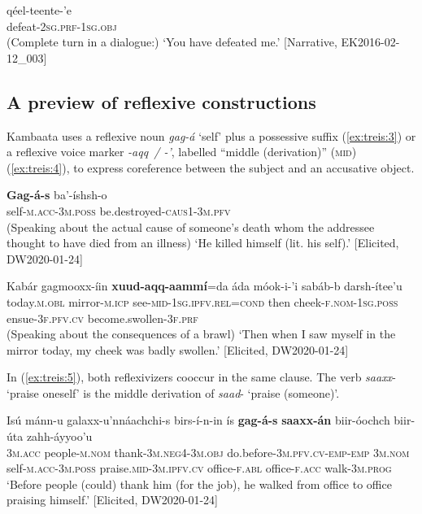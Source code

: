 \documentclass[output=paper]{langscibook}
\begin{document}
\ea\label{ex:treis:2} 
\gll qéel-teente-’e\\
     defeat-2\textsc{sg.prf-1sg.obj}\\
\glt (Complete turn in a dialogue:) ‘You have defeated me.’ [Narrative, EK2016-02-12\_003]
\z

\subsection{A preview of reflexive constructions}\label{sec:treis:1.2}

Kambaata uses a reflexive noun \textit{gag-á} ‘self’ plus a possessive suffix (\ref{ex:treis:3}) or a reflexive voice marker \textit{-aqq~/ -’}, labelled “middle (derivation)” (\textsc{mid}) (\ref{ex:treis:4}), to express coreference between the subject and an accusative object.

\ea\label{ex:treis:3} 
\gll \textbf{Gag-á-s} ba’-íshsh-o\\
     self-\textsc{m.acc-3m.poss} be.destroyed-\textsc{caus1-3m.pfv}\\
\glt (Speaking about the actual cause of someone’s death whom the addressee thought to have died from an illness) ‘He killed himself (lit. his self).’ [Elicited, DW2020-01-24]\z

\ea\label{ex:treis:4} 
\gll Kabár gagmooxx-íin \textbf{xuud-aqq-aammí}=da áda móok-i-’i sabáb-b darsh-ítee’u\\
     today.\textsc{m.obl} mirror-\textsc{m.icp} see-\textsc{mid-1sg.ipfv.rel=cond} then cheek-\textsc{f.nom-1sg.poss} ensue-\textsc{3f.pfv.cv} become.swollen-\textsc{3f.prf}\\
\glt (Speaking about the consequences of a brawl) ‘Then when I saw myself in the mirror today, my cheek was badly swollen.’ [Elicited, DW2020-01-24]\z

In (\ref{ex:treis:5}), both reflexivizers cooccur in the same clause. The verb \textit{saaxx}- ‘praise oneself’ is the middle derivation of \textit{saad}- ‘praise (someone)’.

\ea\label{ex:treis:5} 
\gll Isú mánn-u galaxx-u’nnáachchi-s birs-í-n-in ís \textbf{gag-á-s} \textbf{saaxx-án} biir-óochch biir-úta zahh-áyyoo’u\\
     \textsc{3m.acc} people-\textsc{m.nom} thank-\textsc{3m.neg4-3m.obj} do.before-\textsc{3m.pfv.cv-emp-emp} \textsc{3m.nom} self-\textsc{m.acc-3m.poss} praise.\textsc{mid-3m.ipfv.cv} office-\textsc{f.abl} office-\textsc{f.acc} walk-\textsc{3m.prog}\\
\glt ‘Before people (could) thank him (for the job), he walked from office to office praising himself.’ [Elicited, DW2020-01-24]\z
\end{document}
